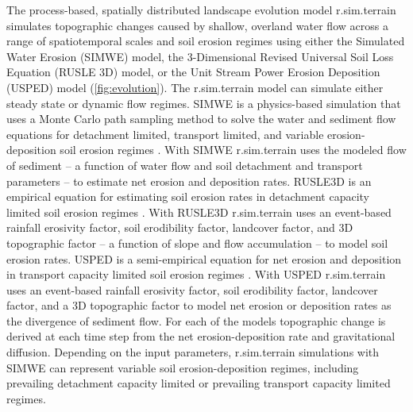 \documentclass[gmd, manuscript]{copernicus}
\begin{document}
The process-based, spatially distributed 
landscape evolution model r.sim.terrain
simulates topographic changes
caused by shallow, overland water flow
across a range of spatiotemporal scales and soil erosion regimes
using either
the Simulated Water Erosion (SIMWE) model, 
the 3-Dimensional Revised Universal Soil Loss Equation (RUSLE 3D) model,
or the Unit Stream Power Erosion Deposition (USPED) model (\ref {fig:evolution}).  
The r.sim.terrain model
can simulate either steady state or dynamic flow regimes.
SIMWE is a physics-based simulation
that uses a Monte Carlo path sampling method
to solve the water and sediment flow equations
for detachment limited, transport limited, and variable erosion-deposition 
soil erosion regimes 
\citep{Mitas1998,Mitasova2004}. 
With SIMWE 
r.sim.terrain
uses the modeled flow of sediment 
-- a function of water flow and soil detachment and transport parameters -- 
to estimate net erosion and deposition rates. 
RUSLE3D is an empirical equation for estimating soil erosion rates
in detachment capacity limited soil erosion regimes 
\citep{Mitasova1996,Mitasova2013}. 
%
With RUSLE3D r.sim.terrain
uses an event-based rainfall erosivity factor, 
soil erodibility factor, landcover factor, and 3D topographic factor
-- a function of slope and flow accumulation --
to model soil erosion rates. 
USPED is a semi-empirical equation for net erosion and deposition 
in transport capacity limited soil erosion regimes 
\citep{Mitasova1996,Mitasova2013}. 
With USPED r.sim.terrain uses an event-based rainfall erosivity factor, 
soil erodibility factor, landcover factor, and a 3D topographic factor
to model net erosion or deposition rates as the divergence of sediment flow. 
For each of the models 
topographic change is derived at each time step
from the net erosion-deposition rate
and gravitational diffusion.
Depending on the input parameters, 
r.sim.terrain simulations with SIMWE 
can represent variable soil erosion-deposition regimes, 
including prevailing detachment capacity limited 
or prevailing transport capacity limited regimes.
\end{document}
